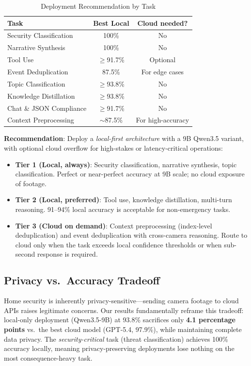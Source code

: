 \documentclass[onecolumn,10pt]{IEEEtran}
\begin{document}
\begin{table}[h]
\centering
\caption{Deployment Recommendation by Task}
\label{tab:recommend}
\small
\begin{tabular}{p{2.6cm}cc}
\toprule
\textbf{Task} & \textbf{Best Local} & \textbf{Cloud needed?} \\
\midrule
Security Classification & 100\% & No \\
Narrative Synthesis & 100\% & No \\
Tool Use & $\geq$91.7\% & Optional \\
Event Deduplication & 87.5\% & For edge cases \\
Topic Classification & $\geq$93.8\% & No \\
Knowledge Distillation & $\geq$93.8\% & No \\
Chat \& JSON Compliance & $\geq$91.7\% & No \\
Context Preprocessing & $\sim$87.5\% & For high-accuracy \\
\bottomrule
\end{tabular}
\end{table}

\textbf{Recommendation}: Deploy a \emph{local-first architecture}
with a 9B Qwen3.5 variant, with optional cloud overflow for
high-stakes or latency-critical operations:
\begin{itemize}[nosep]
    \item \textbf{Tier 1 (Local, always)}: Security classification,
    narrative synthesis, topic classification. Perfect or near-perfect
    accuracy at 9B scale; no cloud exposure of footage.
    \item \textbf{Tier 2 (Local, preferred)}: Tool use, knowledge
    distillation, multi-turn reasoning. 91--94\% local accuracy is
    acceptable for non-emergency tasks.
    \item \textbf{Tier 3 (Cloud on demand)}: Context preprocessing
    (index-level deduplication) and event deduplication with
    cross-camera reasoning. Route to cloud only when the task exceeds
    local confidence thresholds or when sub-second response is required.
\end{itemize}

\subsection{Privacy vs.\ Accuracy Tradeoff}

Home security is inherently privacy-sensitive---sending camera footage
to cloud APIs raises legitimate concerns. Our results fundamentally
reframe this tradeoff: local-only deployment (Qwen3.5-9B) at 93.8\%
sacrifices only \textbf{4.1 percentage points} vs.\ the best cloud
model (GPT-5.4, 97.9\%), while maintaining complete data privacy.
The \emph{security-critical} task (threat classification) achieves
100\% accuracy locally, meaning privacy-preserving deployments lose
nothing on the most consequence-heavy task.
\end{document}
